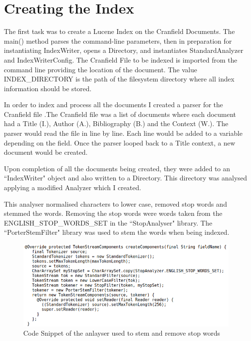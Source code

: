 \section{Creating the Index}

The first task was to create a Lucene Index on the Cranfield Documents. The main() method parses the command-line parameters, then in preparation for instantiating IndexWriter, opens a Directory, and instantiates StandardAnalyzer and IndexWriterConfig. The Cranfield File to be indexed is imported from the command line providing the location of the document. The value INDEX\_DIRECTORY is the path of the filesystem directory where all index information should be stored.  \par 

In order to index and process all the documents I created a parser for the Cranfield file .The Cranfield file was a list of documents where each document had a Title (I.), Author (A.), Bibliography (B.) and the Context (W.). The parser would read the file in line by line. Each line would be added to a variable depending on the field. Once the parser looped back to a Title context, a new document would be created. \par 
	
Upon completion of all the documents being created, they were added to an ``IndexWriter" object and also written to a Directory. This directory was analysed applying a modified Analyzer which I created. \par

This analyser normalised characters to lower case, removed stop words and stemmed the words. Removing the stop words were words taken from the ENGLISH\_STOP\_WORDS\_SET in the ``StopAnalyser" library. The ``PorterStemFilter" library was used to stem the words when being indexed.   \newline

	\begin{figure}[ht!]
		\begin{center}
			\includegraphics[scale=.325 ]{2} 
			\caption{Code Snippet of the anlayser used to stem and remove stop words}
			\label{fig:1}
		\end{center}
	\end{figure} \par

